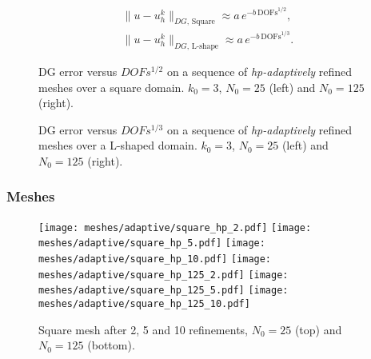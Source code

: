 \begin{gather}
    \lVert u - u^k_h \rVert_{DG, \, \text{Square}} \approx a \, e^{-b \, \text{DOFs}^{1/2}}, \\
    \lVert u - u^k_h \rVert_{DG, \, \text{L-shape}} \approx a \, e^{-b \, \text{DOFs}^{1/3}}.
\end{gather}

\begin{figure}[!ht]
    \begin{subfigure}[b]{0.45\textwidth}
		
	\end{subfigure}
	\hfill
	\begin{subfigure}[b]{0.45\textwidth}
		
	\end{subfigure}
    \caption{DG error versus $DOFs^{1/2}$ on a sequence of \textit{hp-adaptively} refined meshes over a square domain. $k_0 = 3$, $N_0 = 25$ (left) and $N_0 = 125$ (right).}
\end{figure}

\begin{figure}[!ht]
    \begin{subfigure}[b]{0.45\textwidth}
		
	\end{subfigure}
	\hfill
	\begin{subfigure}[b]{0.45\textwidth}
		
	\end{subfigure}
    \caption{DG error versus $DOFs^{1/3}$ on a sequence of \textit{hp-adaptively} refined meshes over a L-shaped domain. $k_0 = 3$, $N_0 = 25$ (left) and $N_0 = 125$ (right).}
\end{figure}

\newpage
\subsubsection{Meshes}

\begin{figure}[!ht]
	\centering
    \texttt{[image: meshes/adaptive/square\_hp\_2.pdf]}
	\texttt{[image: meshes/adaptive/square\_hp\_5.pdf]}
	\texttt{[image: meshes/adaptive/square\_hp\_10.pdf]}
    \texttt{[image: meshes/adaptive/square\_hp\_125\_2.pdf]}
	\texttt{[image: meshes/adaptive/square\_hp\_125\_5.pdf]}
	\texttt{[image: meshes/adaptive/square\_hp\_125\_10.pdf]}
	\caption{Square mesh after 2, 5 and 10 refinements, $N_0 = 25$ (top) and $N_0 = 125$ (bottom).}
\end{figure}

